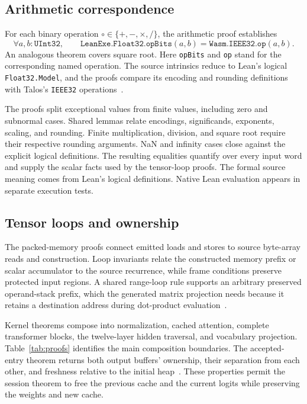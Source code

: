 \documentclass[11pt]{article}
\newcommand{\code}[1]{\texttt{#1}}
\begin{document}
\subsection{Arithmetic correspondence}

For each binary operation $\circ\in\{+,-,\times,/\}$, the arithmetic proof establishes
\[
\forall a,b:\code{UInt32},\qquad
\code{LeanExe.Float32.opBits}(a,b)
=\code{Wasm.IEEE32.op}(a,b).
\]
An analogous theorem covers square root.  Here \code{opBits} and \code{op} stand for the corresponding named operation.  The source intrinsics reduce to Lean's logical \code{Float32.Model}, and the proofs compare its encoding and rounding definitions with Talos's \code{IEEE32} operations~\cite{f32,leanfloat}.

The proofs split exceptional values from finite values, including zero and subnormal cases.  Shared lemmas relate encodings, significands, exponents, scaling, and rounding.  Finite multiplication, division, and square root require their respective rounding arguments.  NaN and infinity cases close against the explicit logical definitions.  The resulting equalities quantify over every input word and supply the scalar facts used by the tensor-loop proofs.  The formal source meaning comes from Lean's logical definitions.  Native Lean evaluation appears in separate execution tests.

\subsection{Tensor loops and ownership}

The packed-memory proofs connect emitted loads and stores to source byte-array reads and construction.  Loop invariants relate the constructed memory prefix or scalar accumulator to the source recurrence, while frame conditions preserve protected input regions.  A shared range-loop rule supports an arbitrary preserved operand-stack prefix, which the generated matrix projection needs because it retains a destination address during dot-product evaluation~\cite{loops}.

Kernel theorems compose into normalization, cached attention, complete transformer blocks, the twelve-layer hidden traversal, and vocabulary projection.  Table~\ref{tab:proofs} identifies the main composition boundaries.  The accepted-entry theorem returns both output buffers' ownership, their separation from each other, and freshness relative to the initial heap~\cite{entry}.  These properties permit the session theorem to free the previous cache and the current logits while preserving the weights and new cache.
\end{document}
